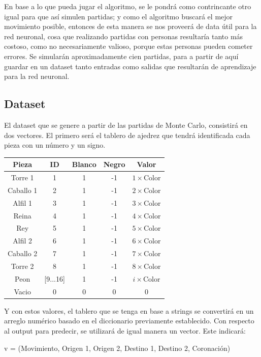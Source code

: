 En base a lo que pueda jugar el algoritmo, se le pondrá como contrincante otro igual para que así simulen partidas; y como el algoritmo buscará el mejor movimiento posible, entonces de esta manera se nos proveerá de data útil para la red neuronal, cosa que realizando partidas con personas resultaría tanto más costoso, como no necesariamente valioso, porque estas personas pueden cometer errores. Se simularán aproximadamente cien partidas, para a partir de aquí guardar en un dataset tanto entradas como salidas que resultarán de aprendizaje para la red neuronal.

\subsection{Dataset}
El dataset que se genere a partir de las partidas de Monte Carlo, consistirá en dos vectores. El primero será el tablero de ajedrez que tendrá identificada cada pieza con un número y un signo.

\begin{tabular}{|c|c|c|c|c|}
	\hline
	\textbf{Pieza} & \textbf{ID} & \textbf{Blanco} & \textbf{Negro} & \textbf{Valor} \\ \hline
	Torre 1 & 1 & 1 & -1 & $1 \times \text{Color}$ \\ \hline
	Caballo 1 & 2 & 1 & -1 & $2 \times \text{Color}$ \\ \hline
	Alfil 1 & 3 & 1 & -1 & $3 \times \text{Color}$ \\ \hline
	Reina & 4 & 1 & -1 & $4 \times \text{Color}$ \\ \hline
	Rey & 5 & 1 & -1 & $5 \times \text{Color}$ \\ \hline
	Alfil 2 & 6 & 1 & -1 & $6 \times \text{Color}$ \\ \hline
	Caballo 2 & 7 & 1 & -1 & $7 \times \text{Color}$ \\ \hline
	Torre 2 & 8 & 1 & -1 & $8 \times \text{Color}$ \\ \hline
	Peon & [9...16] & 1 & -1 & $i \times \text{Color}$ \\ \hline
	Vacio & 0 & 0 & 0 & 0 \\ \hline
\end{tabular}

Y con estos valores, el tablero que se tenga en base a strings se convertirá en un arreglo numérico basado en el diccionario previamente establecido.
Con respecto al output para predecir, se utilizará de igual manera un vector. Este indicará:

v = (Movimiento, Origen 1, Origen 2, Destino 1, Destino 2, Coronación)

